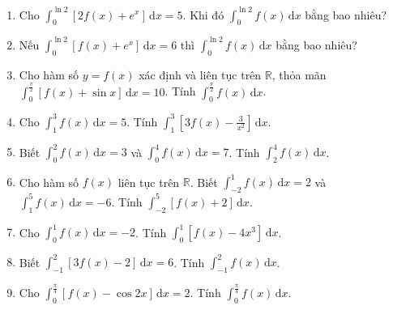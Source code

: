 \documentclass[12pt]{article}
\begin{document}
\begin{enumerate}[label=\textbf{Câu \arabic*.}]
		\item Cho $\displaystyle \int_0^{\ln 2} [2f(x)+e^x]\,\mathrm{d}x = 5$. Khi đó $\displaystyle \int_0^{\ln 2} f(x)\,\mathrm{d}x$ bằng bao nhiêu?
		\vspace{0.75cm}
		
		\item Nếu $\displaystyle \int_0^{\ln 2} [f(x)+e^x]\,\mathrm{d}x = 6$ thì $\displaystyle \int_0^{\ln 2} f(x)\,\mathrm{d}x$ bằng bao nhiêu?
		\vspace{0.75cm}
		
		\item Cho hàm số $y=f(x)$ xác định và liên tục trên $\mathbb{R}$, thỏa mãn $\displaystyle \int_0^{\frac{\pi}{2}} [f(x)+\sin x]\,\mathrm{d}x = 10$. Tính $\displaystyle \int_0^{\frac{\pi}{2}} f(x)\,\mathrm{d}x$.
		\vspace{0.75cm}
		
		\item Cho $\displaystyle \int_1^3 f(x)\,\mathrm{d}x = 5$. Tính $\displaystyle \int_1^3 \left[3f(x) - \frac{3}{x^2}\right]\,\mathrm{d}x$.
		\vspace{0.75cm}
		
		\item Biết $\displaystyle \int_0^2 f(x)\,\mathrm{d}x = 3$ và $\displaystyle \int_0^4 f(x)\,\mathrm{d}x = 7$. Tính $\displaystyle \int_2^4 f(x)\,\mathrm{d}x$.
		\vspace{0.75cm}
		
		\item Cho hàm số $f(x)$ liên tục trên $\mathbb{R}$. Biết $\displaystyle \int_{-2}^1 f(x)\,\mathrm{d}x = 2$ và $\displaystyle \int_1^5 f(x)\,\mathrm{d}x = -6$. Tính $\displaystyle \int_{-2}^5 [f(x) + 2]\,\mathrm{d}x$.
		\vspace{0.75cm}
		
		\item Cho $\displaystyle \int_0^1 f(x)\,\mathrm{d}x = -2$. Tính $\displaystyle \int_0^1 \left[f(x) - 4x^3\right]\,\mathrm{d}x$.
		\vspace{0.75cm}
		
		\item Biết $\displaystyle \int_{-1}^2 [3f(x) - 2]\,\mathrm{d}x = 6$. Tính $\displaystyle \int_{-1}^2 f(x)\,\mathrm{d}x$.
		\vspace{0.75cm}
		
		\item Cho $\displaystyle \int_0^{\frac{\pi}{4}} [f(x) - \cos 2x]\,\mathrm{d}x = 2$. Tính $\displaystyle \int_0^{\frac{\pi}{4}} f(x)\,\mathrm{d}x$.
		\vspace{0.75cm}
		

\end{enumerate}
\end{document}
